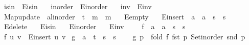 \begin{isabellebody}
\ \ isin\ {\isacharequal}{\kern0pt}\ E{\isacharunderscore}{\kern0pt}isin\ \isanewline
\ \ inorder\ {\isacharequal}{\kern0pt}\ E{\isacharunderscore}{\kern0pt}inorder\ \isanewline
\ \ inv\ {\isacharequal}{\kern0pt}\ E{\isacharunderscore}{\kern0pt}inv\ \isanewline
\ \ Map{\isacharunderscore}{\kern0pt}update\ {\isacharcolon}{\kern0pt}{\isacharcolon}{\kern0pt}\ {\isachardoublequoteopen}{\isacharprime}{\kern0pt}a{\isacharcolon}{\kern0pt}{\isacharcolon}{\kern0pt}linorder\ {\isasymRightarrow}\ {\isacharprime}{\kern0pt}t\ {\isasymRightarrow}\ {\isacharprime}{\kern0pt}m\ {\isasymRightarrow}\ {\isacharprime}{\kern0pt}m{\isachardoublequoteclose}\ \isanewline
\ \ E{\isacharunderscore}{\kern0pt}empty\ \isanewline
\ \ E{\isacharunderscore}{\kern0pt}insert\ {\isacharcolon}{\kern0pt}{\isacharcolon}{\kern0pt}\ {\isachardoublequoteopen}{\isacharprime}{\kern0pt}a\ {\isasymtimes}\ {\isacharprime}{\kern0pt}a\ {\isasymRightarrow}\ {\isacharprime}{\kern0pt}s\ {\isasymRightarrow}\ {\isacharprime}{\kern0pt}s{\isachardoublequoteclose}\ \isanewline
\ \ E{\isacharunderscore}{\kern0pt}delete\ \isanewline
\ \ E{\isacharunderscore}{\kern0pt}isin\ \isanewline
\ \ E{\isacharunderscore}{\kern0pt}inorder\ \isanewline
\ \ E{\isacharunderscore}{\kern0pt}inv\isanewline
{}\ %
\endisataginvisible
{\isafoldinvisible}%
%
\isadeliminvisible
%
\endisadeliminvisible
\ \isanewline
\isanewline
{}\isamarkupfalse%
\ f\ {\isacharcolon}{\kern0pt}{\isacharcolon}{\kern0pt}\ {\isachardoublequoteopen}{\isacharprime}{\kern0pt}a\ {\isasymRightarrow}\ {\isacharprime}{\kern0pt}a\ {\isasymRightarrow}\ {\isacharprime}{\kern0pt}s\ {\isasymRightarrow}\ {\isacharprime}{\kern0pt}s{\isachardoublequoteclose}\ \isanewline
\ \ {\isachardoublequoteopen}f\ u\ v\ {\isasymequiv}\ E{\isacharunderscore}{\kern0pt}insert\ {\isacharparenleft}{\kern0pt}u{\isacharcomma}{\kern0pt}\ v{\isacharparenright}{\kern0pt}{\isachardoublequoteclose}\isanewline
\isanewline
{}\isamarkupfalse%
\ g\ {\isacharcolon}{\kern0pt}{\isacharcolon}{\kern0pt}\ {\isachardoublequoteopen}{\isacharprime}{\kern0pt}a\ {\isasymtimes}\ {\isacharprime}{\kern0pt}t\ {\isasymRightarrow}\ {\isacharprime}{\kern0pt}s\ {\isasymRightarrow}\ {\isacharprime}{\kern0pt}s{\isachardoublequoteclose}\ \ \isanewline
\ \ {\isachardoublequoteopen}g\ p\ {\isasymequiv}\ fold\ {\isacharparenleft}{\kern0pt}f\ {\isacharparenleft}{\kern0pt}fst\ p{\isacharparenright}{\kern0pt}{\isacharparenright}{\kern0pt}\ {\isacharparenleft}{\kern0pt}Set{\isacharunderscore}{\kern0pt}inorder\ {\isacharparenleft}{\kern0pt}snd\ p{\isacharparenright}{\kern0pt}{\isacharparenright}{\kern0pt}{\isachardoublequoteclose}\isanewline

\end{isabellebody}

